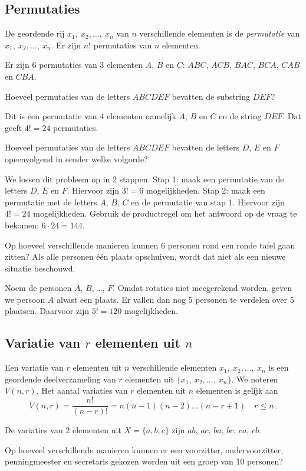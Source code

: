 \subsection{Permutaties}
De geordende rij $x_1,~x_2,\dots,~x_n$ van $n$ verschillende elementen is de \emph{permutatie} van  $x_1,~x_2,\dots,~x_n$.
Er zijn $n!$ permutaties van $n$ elementen.

\voorbeeld
Er zijn 6 permutaties van 3 elementen $A$, $B$ en $C$: $ABC$, $ACB$, $BAC$, $BCA$, $CAB$ en $CBA$.

\voorbeeld
Hoeveel permutaties van de letters $ABCDEF$ bevatten de substring $DEF$? 

Dit is een permutatie van 4 elementen namelijk $A$, $B$ en $C$ en de string $DEF$. Dat geeft $4!=24$ permutaties.

\voorbeeld 
Hoeveel permutaties van de letters $ABCDEF$ bevatten de letters $D$, $E$ en $F$ opeenvolgend in eender welke volgorde?

We lossen dit probleem op in 2 stappen. Stap 1: maak een permutatie van de letters $D$, $E$ en $F$. Hiervoor zijn $3!=6$ mogelijkheden. Stap 2: maak een permutatie met de letters $A$, $B$, $C$ en de permutatie van stap 1. Hiervoor zijn $4!=24$ mogelijkheden. Gebruik de productregel om het antwoord op de vraag te bekomen: $6\cdot 24=144$.

\voorbeeld
Op hoeveel verschillende manieren kunnen 6 personen rond een ronde tafel gaan zitten? Als alle personen één plaats opschuiven, wordt dat niet als een nieuwe situatie beschouwd.

Noem de personen $A$, $B$, \dots, $F$. Omdat rotaties niet meegerekend worden, geven we persoon $A$ alvast een plaats. Er vallen dan nog 5 personen te verdelen over 5 plaatsen. Daarvoor zijn $5!=120$ mogelijkheden.

\subsection{Variatie van $r$ elementen uit $n$}
Een variatie van $r$ elementen uit $n$ verschillende elementen $x_1,~x_2,\dots,~x_n$ is een geordende deelverzameling van $r$ elementen uit $\{x_1,~x_2,\dots,~x_n\}$. 
We noteren $V(n,r)$. Het aantal variaties van $r$ elementen uit $n$ elementen is gelijk aan \[V(n,r)=\frac{n!}{(n-r)!}=n(n-1)(n-2)\dots(n-r+1)\quad r\leq n\,.\]

\voorbeeld
De variaties van 2 elementen uit $X=\{a,b,c\}$ zijn $ab$, $ac$, $ba$, $bc$, $ca$, $cb$.

\voorbeeld
Op hoeveel verschillende manieren kunnen er een voorzitter, ondervoorzitter, penningmeester en secretaris gekozen worden uit een groep van 10 personen?

